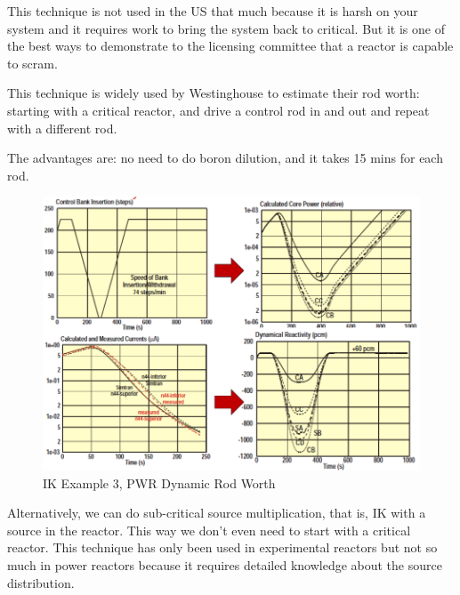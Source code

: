\documentclass{school-22.211-notes}
\begin{document}
This technique is not used in the US that much because it is harsh on your system and it requires work to bring the system back to critical. But it is one of the best ways to demonstrate to the licensing committee that a reactor is capable to scram.  

 \label{dynamic-rod-worth}
This technique is widely used by Westinghouse to estimate their rod worth: starting with a critical reactor, and drive a control rod in and out and repeat with a different rod. 

The advantages are: no need to do boron dilution, and it takes 15 mins for each rod. 
\begin{figure}[ht]
  \centering
  \includegraphics[width=5in]{images/pke/ik-ex3b.png}
  \caption{IK Example 3, PWR Dynamic Rod Worth} \label{ik-ex3}
\end{figure}

Alternatively, we can do sub-critical source multiplication, that is, IK with a source in the reactor. This way we don't even need to start with a critical reactor. This technique has only been used in experimental reactors but not so much in power reactors because it requires detailed knowledge about the source distribution. 
\end{document}
